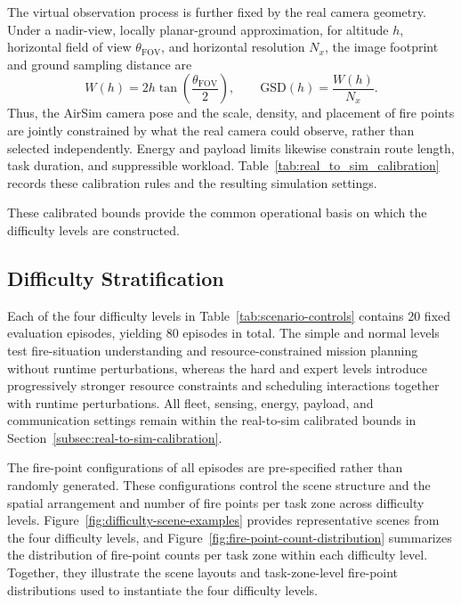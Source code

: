 The virtual observation process is further fixed by the real camera geometry.
Under a nadir-view, locally planar-ground approximation, for altitude $h$,
horizontal field of view $\theta_{\mathrm{FOV}}$, and horizontal
resolution $N_x$, the image footprint and ground sampling distance are
\begin{equation}
W(h)=2h\tan\left(\frac{\theta_{\mathrm{FOV}}}{2}\right),\qquad
\mathrm{GSD}(h)=\frac{W(h)}{N_x}.
\label{eq:observation-geometry}
\end{equation}
Thus, the AirSim camera pose and the scale, density, and placement of fire
points are jointly constrained by what the real camera could observe, rather
than selected independently. Energy and payload limits likewise constrain route
length, task duration, and suppressible workload. Table~\ref{tab:real_to_sim_calibration}
records these calibration rules and the resulting simulation settings.



These calibrated bounds provide the common operational basis on which the
difficulty levels are constructed.

\subsection{Difficulty Stratification}
Each of the four difficulty levels in Table~\ref{tab:scenario-controls}
contains 20 fixed evaluation episodes, yielding 80 episodes in total. The simple
and normal levels test fire-situation understanding and resource-constrained
mission planning without runtime perturbations, whereas the hard and expert
levels introduce progressively stronger resource constraints and scheduling
interactions together with runtime perturbations. All fleet, sensing, energy,
payload, and communication settings
remain within the real-to-sim calibrated bounds in
Section~\ref{subsec:real-to-sim-calibration}.



The fire-point configurations of all episodes are pre-specified rather than
randomly generated. These configurations control the scene structure
and the spatial arrangement and number of fire points per task zone across
difficulty levels.
Figure~\ref{fig:difficulty-scene-examples} provides representative scenes from
the four difficulty levels, and Figure~\ref{fig:fire-point-count-distribution} summarizes
the distribution of fire-point counts per task zone within each difficulty level. Together,
they illustrate the scene layouts and task-zone-level fire-point distributions
used to instantiate the four difficulty levels.

